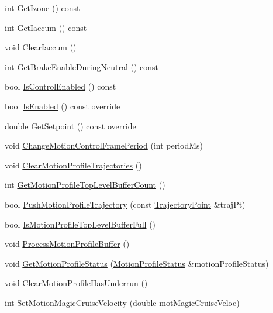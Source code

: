 \begin{DoxyCompactItemize}
\item 
int \hyperlink{class_c_a_n_talon_a492373ce8d2553d185ed56f2627e9f4c}{Get\+Izone} () const
\item 
int \hyperlink{class_c_a_n_talon_ad675d77fe044d57525b02b3b01219557}{Get\+Iaccum} () const
\item 
void \hyperlink{class_c_a_n_talon_aee51ab1fb48c625361d77e73d3c158a0}{Clear\+Iaccum} ()
\item 
int \hyperlink{class_c_a_n_talon_ab29ed3beec31e98ce66ce66a5552fed3}{Get\+Brake\+Enable\+During\+Neutral} () const
\item 
bool \hyperlink{class_c_a_n_talon_a6369d85290e29a12b6521f6f6f04cbf0}{Is\+Control\+Enabled} () const
\item 
bool \hyperlink{class_c_a_n_talon_a33ae2a0684d9655145fdff51dc57a032}{Is\+Enabled} () const override
\item 
double \hyperlink{class_c_a_n_talon_a4a96f9770af682f3462442a1bb2a0581}{Get\+Setpoint} () const override
\item 
void \hyperlink{class_c_a_n_talon_a2800e203e1e13587acb2b94df2fc4260}{Change\+Motion\+Control\+Frame\+Period} (int period\+Ms)
\item 
void \hyperlink{class_c_a_n_talon_accccf75c371c510174a91b350d57135c}{Clear\+Motion\+Profile\+Trajectories} ()
\item 
int \hyperlink{class_c_a_n_talon_a228e78ebfb9d4947fcf2e075791fac21}{Get\+Motion\+Profile\+Top\+Level\+Buffer\+Count} ()
\item 
bool \hyperlink{class_c_a_n_talon_ad1a6d30f15c781574dd9e621938003c1}{Push\+Motion\+Profile\+Trajectory} (const \hyperlink{struct_c_a_n_talon_1_1_trajectory_point}{Trajectory\+Point} \&traj\+Pt)
\item 
bool \hyperlink{class_c_a_n_talon_a9f75a483beea0902e1e6595ab15489ab}{Is\+Motion\+Profile\+Top\+Level\+Buffer\+Full} ()
\item 
void \hyperlink{class_c_a_n_talon_acae568b6fd2f765dfd0c40d2533a3274}{Process\+Motion\+Profile\+Buffer} ()
\item 
void \hyperlink{class_c_a_n_talon_a67e151009a27f9ce3317fc040fb85d2a}{Get\+Motion\+Profile\+Status} (\hyperlink{struct_c_a_n_talon_1_1_motion_profile_status}{Motion\+Profile\+Status} \&motion\+Profile\+Status)
\item 
void \hyperlink{class_c_a_n_talon_a0a5798f899e2e112500eabdeccfde8fa}{Clear\+Motion\+Profile\+Has\+Underrun} ()
\item 
int \hyperlink{class_c_a_n_talon_aa7cb01a5984ae5e93384792f46be21f8}{Set\+Motion\+Magic\+Cruise\+Velocity} (double mot\+Magic\+Cruise\+Veloc)

\end{DoxyCompactItemize}
